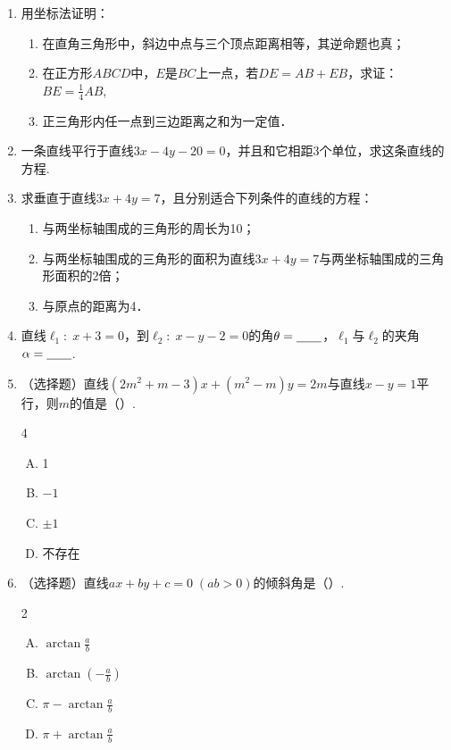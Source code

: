 \begin{enumerate}
\item 用坐标法证明：
\begin{enumerate}[(1)]
\item 在直角三角形中，斜边中点与三个顶点距离相等，其逆命题也真；
\item 在正方形$ABCD$中，$E$是$BC$上一点，若$DE=AB+EB$，求证：$BE=\frac{1}{4}AB$,
\item 正三角形内任一点到三边距离之和为一定值．
\end{enumerate}

\item 一条直线平行于直线$3x-4y-20=0$，并且和它相距3个单位，求这条直线的方程.
\item 求垂直于直线$3x+4y=7$，且分别适合下列条件的直线的方程：
\begin{enumerate}[(1)]
\item 与两坐标轴围成的三角形的周长为10；
\item 与两坐标轴围成的三角形的面积为直线$3x+4y=7$与两坐标轴围成的三角形面积的2倍；
\item 与原点的距离为4．
\end{enumerate}

\item 直线$\ell_1:\; x+3=0$，到$\ell_2:\; x-y-2=0$的角$\theta=\underline{\qquad}$，$\ell_1$与$\ell_2$的夹角$\alpha=\underline{\qquad}$.
\item （选择题）直线$(2m^2+m-3)x+(m^2-m)y=2m$与直线$x-y=1$平行，则$m$的值是（\qquad ）.
\begin{multicols}{4}
\begin{enumerate}[(A)]
    \item 1
    \item $-1$
    \item $\pm 1$
    \item 不存在
\end{enumerate}
\end{multicols}

\item （选择题）直线$ax+by+c=0\; (ab>0)$的倾斜角是（\qquad）.
\begin{multicols}{2}
\begin{enumerate}[(A)]
    \item $\arctan\frac{a}{b}$
    \item $\arctan\left(-\frac{a}{b}\right)$
    \item $\pi-\arctan\frac{a}{b}$
    \item $\pi+\arctan\frac{a}{b}$
\end{enumerate}
\end{multicols}
\end{enumerate}


